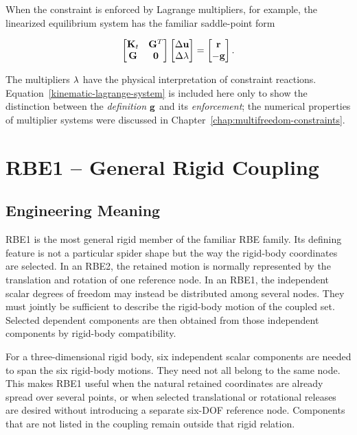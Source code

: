 When the constraint is enforced by Lagrange multipliers, for example, the
linearized equilibrium system has the familiar saddle-point form

\begin{equation}\label{kinematic-lagrange-system}
    \begin{bmatrix}
        \mathbf{K}_t & \mathbf{G}^T \\
        \mathbf{G}   & \mathbf{0}
    \end{bmatrix}
    \begin{bmatrix}
        \Delta\mathbf{u} \\
        \Delta\mathbf{\lambda}
    \end{bmatrix}
    =
    \begin{bmatrix}
        \mathbf{r} \\
        -\mathbf{g}
    \end{bmatrix}.
\end{equation}

The multipliers $\mathbf{\lambda}$ have the physical interpretation of constraint
reactions. Equation~\eqref{kinematic-lagrange-system} is included here only to
show the distinction between the \textit{definition} $\mathbf{g}$ and its
\textit{enforcement}; the numerical properties of multiplier systems were
discussed in Chapter~\ref{chap:multifreedom-constraints}.

\section{RBE1 -- General Rigid Coupling}\label{sec:rbe1}

\subsection{Engineering Meaning}

RBE1 is the most general rigid member of the familiar RBE family. Its defining
feature is not a particular spider shape but the way the rigid-body coordinates
are selected. In an RBE2, the retained motion is normally represented by the
translation and rotation of one reference node. In an RBE1, the independent
scalar degrees of freedom may instead be distributed among several nodes. They
must jointly be sufficient to describe the rigid-body motion of the coupled set.
Selected dependent components are then obtained from those independent components
by rigid-body compatibility.

For a three-dimensional rigid body, six independent scalar components are needed
to span the six rigid-body motions. They need not all belong to the same node.
This makes RBE1 useful when the natural retained coordinates are already spread
over several points, or when selected translational or rotational releases are
desired without introducing a separate six-DOF reference node. Components that
are not listed in the coupling remain outside that rigid relation.

